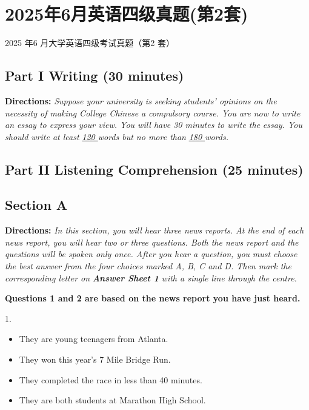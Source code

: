 \documentclass[UTF8,11pt]{ctexart}
\begin{document}
\section*{2025年6月英语四级真题(第2套)}
2025 年6 月大学英语四级考试真题（第2 套）


\subsection*{\textbf{Part I Writing} \textbf{(30 minutes)}}


\textbf{Directions:} \textit{Suppose your university is seeking students’ opinions on the necessity of making College Chinese a} \textit{compulsory course. You are now to write an essay to express your view. You will have 30 minutes to write the} \textit{essay. You should write at least }\textit{\uline{120 }}\textit{words but no more than }\textit{\uline{180 }}\textit{words.}


\subsection*{\textbf{Part II} \textbf{Listening Comprehension} \textbf{(25 minutes)}}


\subsection*{\textbf{Section A}}


\textbf{Directions:} \textit{In this section, you will hear three news reports. At the end of each news report, you will hear two or} \textit{three questions. Both the news report and the questions will be spoken only once. After you hear a question, you} \textit{must choose the best answer from the four choices marked A, B, C and D. Then mark the corresponding letter on} \textbf{\textit{Answer Sheet 1}}\textit{ with a single line through the centre.}


\textbf{Questions 1 and 2 are based on the news report you have just heard.}


1.


\begin{itemize}[leftmargin=2em,itemsep=.2em,topsep=.4em]\item[A.] They are young teenagers from Atlanta.
\item[B.] They won this year’s 7 Mile Bridge Run.
\item[C.] They completed the race in less than 40 minutes.
\item[D.] They are both students at Marathon High School.
\end{itemize}
\end{document}
